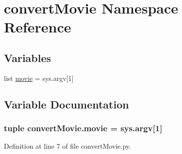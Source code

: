 \hypertarget{namespaceconvert_movie}{\section{convert\-Movie Namespace Reference}
\label{namespaceconvert_movie}
}
\subsection*{Variables}
\begin{DoxyCompactItemize}
\item 
list \hyperlink{namespaceconvert_movie_acd3aef3607e8a7d211d0e319a7d7f7ea}{movie} = sys.\-argv\mbox{[}1\mbox{]}
\end{DoxyCompactItemize}


\subsection{Variable Documentation}
\hypertarget{namespaceconvert_movie_acd3aef3607e8a7d211d0e319a7d7f7ea}{
\subsubsection[{movie}]{\setlength{\rightskip}{0pt plus 5cm}tuple convert\-Movie.\-movie = sys.\-argv\mbox{[}1\mbox{]}}}\label{namespaceconvert_movie_acd3aef3607e8a7d211d0e319a7d7f7ea}


Definition at line 7 of file convert\-Movie.\-py.

